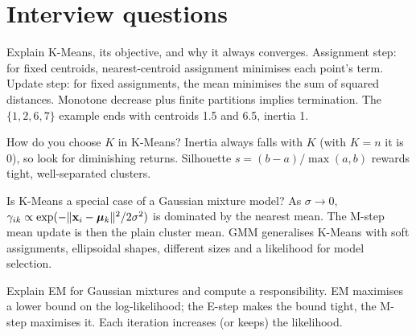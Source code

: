 \section{Interview questions}

\begin{qa}{Explain K-Means, its objective, and why it always converges.}
\why Assignment step: for fixed centroids, nearest-centroid assignment minimises each point's term. Update step: for fixed assignments, the mean
minimises the sum of squared distances. Monotone decrease plus finite partitions implies termination.
\worked The $\{1,2,6,7\}$ example ends with centroids 1.5 and 6.5, inertia 1.
\end{qa}

\begin{qa}{How do you choose $K$ in K-Means?}
\why Inertia always falls with $K$ (with $K = n$ it is 0), so look for diminishing returns. Silhouette $s = (b - a)/\max(a,b)$ rewards tight,
well-separated clusters.
\end{qa}

\begin{qa}{\deep Is K-Means a special case of a Gaussian mixture model?}
\why As $\sigma\to0$, $\gamma_{ik}\propto\exp(-\lVert \mathbf x_i - \boldsymbol\mu_k\rVert^2/2\sigma^2)$ is dominated by the nearest mean. The M-step mean update is
then the plain cluster mean. GMM generalises K-Means with soft assignments, ellipsoidal shapes, different sizes and a likelihood for model selection.
\end{qa}

\begin{qa}{Explain EM for Gaussian mixtures and compute a responsibility.}
\why EM maximises a lower bound on the log-likelihood; the E-step makes the bound tight, the M-step maximises it. Each iteration increases (or keeps)
the likelihood.
\end{qa}

